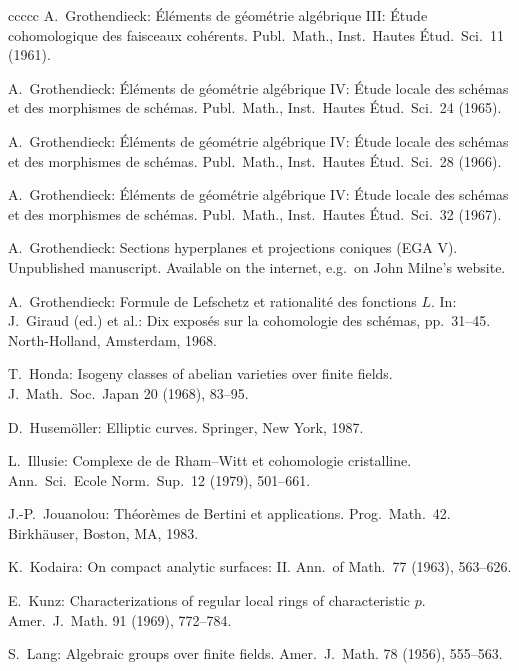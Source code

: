 \documentclass[oneside, 12pt]{amsart}
\theoremstyle{definition}
\theoremstyle{remark}
\begin{document}
\begin{thebibliography}{ccccc}
A.\ Grothendieck:
\'El\'ements de g\'eom\'etrie alg\'ebrique III:
\'Etude cohomologique des faisceaux coh\'erents.
Publ.\ Math., Inst.\ Hautes \'Etud.\ Sci.\ 11 (1961).

A.\ Grothendieck:
\'El\'ements de g\'eom\'etrie alg\'ebrique IV: \'Etude locale des
sch\'emas et des morphismes de sch\'emas.
Publ.\ Math., Inst.\ Hautes \'Etud.\ Sci.\   24 (1965).

A.\ Grothendieck:
\'El\'ements de g\'eom\'etrie alg\'ebrique IV: \'Etude locale des
sch\'emas et des morphismes de sch\'emas.
Publ.\ Math., Inst.\ Hautes \'Etud.\ Sci.\  28 (1966).

A.\ Grothendieck:
\'El\'ements de g\'eom\'etrie alg\'ebrique IV: \'Etude locale des
sch\'emas et des morphismes de sch\'emas.
Publ.\ Math., Inst.\ Hautes \'Etud.\ Sci.\   32 (1967).

A.\ Grothendieck:
Sections hyperplanes et projections coniques (EGA V).
Unpublished manuscript.
Available on the internet, e.g.\ on John Milne's website.

A.\ Grothendieck:
Formule de Lefschetz et rationalit\'e des fonctions $L$.
In: 
J.\ Giraud (ed.) et al.: Dix expos\'es sur la cohomologie des sch\'emas, pp.\ 31--45.
North-Holland, Amsterdam, 1968.

T.\ Honda:
Isogeny classes of abelian varieties over finite fields.
J.\ Math.\ Soc.\ Japan 20 (1968), 83--95. 

D.\ Husem\"oller: 
Elliptic curves. 
Springer, New York, 1987.

L.\ Illusie:
Complexe de de Rham--Witt et cohomologie cristalline. 
Ann.\ Sci.\ Ecole Norm.\ Sup.\  12 (1979), 501--661.

J.-P.\ Jouanolou:
Th\'eor\`emes de Bertini et applications.
Prog.\ Math.\  42.
Birkh\"auser, Boston, MA, 1983.
% 

K.\ Kodaira:
On compact analytic surfaces: II.
Ann.\ of Math.\  77 (1963), 563--626.

E.\ Kunz:
Characterizations of regular local rings of characteristic $p$.
Amer.\ J.\ Math. 91 (1969), 772--784. 

S.\ Lang:
Algebraic groups over finite fields.
Amer.\ J.\ Math. 78 (1956), 555--563. 


\end{thebibliography}
\end{document}
